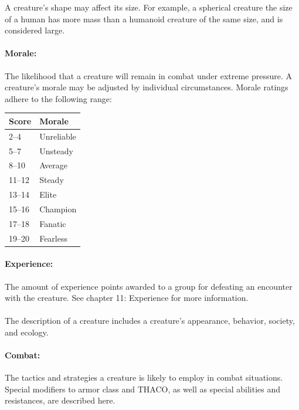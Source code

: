 \begin{multicols}{2}
\begin{minipage}{\columnwidth}
\end{minipage}

A creature's shape may affect its size.  For example, a spherical creature the size of a human has more mass than a humanoid creature of the same size, and is considered large.  

\paragraph{Morale:} The likelihood that a creature will remain in combat under extreme pressure. A creature's morale may be adjusted by individual circumstances. Morale ratings adhere to the following range:

\noindent
\begin{minipage}{\columnwidth}

\noindent
\begin{tabular}{|p{}|p{}|}
\hline
Score	& Morale \\
\hline\hline
\rowcolor[gray]{.9}2--4	& Unreliable \\
5--7	& Unsteady \\
\rowcolor[gray]{.9}8--10	& Average \\
11--12	& Steady \\
\rowcolor[gray]{.9}13--14	& Elite \\
15--16	& Champion \\
\rowcolor[gray]{.9}17--18	& Fanatic \\
19--20	& Fearless \\
\hline
\end{tabular}

\end{minipage}

\paragraph{Experience:} The amount of experience points awarded to a group for defeating an encounter with the creature. See chapter 11: Experience for more information.

\paragraph{} The description of a creature includes a creature's appearance, behavior, society, and ecology. 

\paragraph{Combat:} The tactics and strategies a creature is likely to employ in combat situations. Special modifiers to armor class and THACO, as well as special abilities and resistances, are described here.


\end{multicols}
